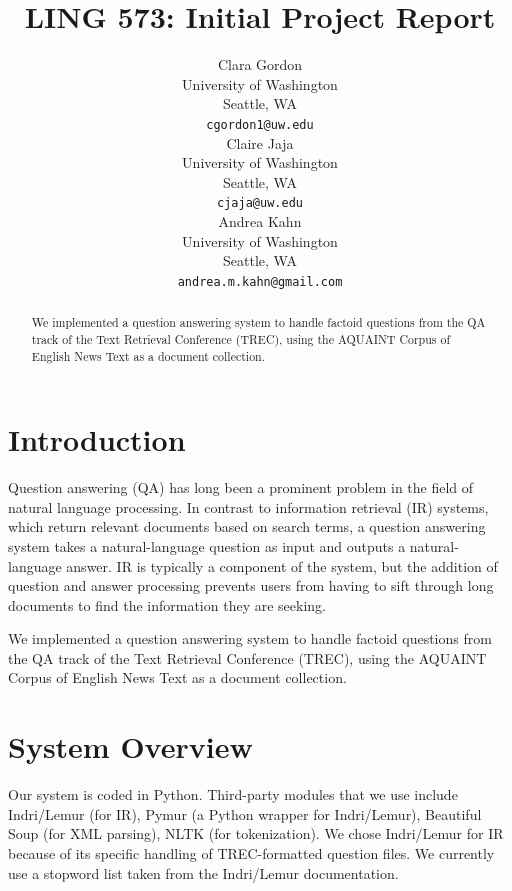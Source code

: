 \documentclass[11pt]{article}
\title{LING 573: Initial Project Report}
\author{Clara Gordon \\
  University of Washington \\
  Seattle, WA \\
  {\tt cgordon1@uw.edu} \\\And
  Claire Jaja \\
  University of Washington \\
  Seattle, WA \\
  {\tt cjaja@uw.edu} \\\And
  Andrea Kahn \\
  University of Washington \\
  Seattle, WA \\
  {\tt andrea.m.kahn@gmail.com} \\}
\date{}
\begin{document}
\maketitle
\begin{abstract}

We implemented a question answering system to handle factoid questions from the QA track of the Text Retrieval Conference (TREC), using the AQUAINT Corpus of English News Text as a document collection.

\end{abstract}

\section{Introduction}

Question answering (QA) has long been a prominent problem in the field of natural language processing. In contrast to information retrieval (IR) systems, which return relevant documents based on search terms, a question answering system takes a natural-language question as input and outputs a natural-language answer. IR is typically a component of the system, but the addition of question and answer processing prevents users from having to sift through long documents to find the information they are seeking.

We implemented a question answering system to handle factoid questions from the QA track of the Text Retrieval Conference (TREC), using the AQUAINT Corpus of English News Text as a document collection.

\section{System Overview}

Our system is coded in Python. Third-party modules that we use include Indri/Lemur (for IR), Pymur (a Python wrapper for Indri/Lemur), Beautiful Soup (for XML parsing), NLTK (for tokenization). We chose Indri/Lemur for IR because of its specific handling of TREC-formatted question files. We currently use a stopword list taken from the Indri/Lemur documentation.
\end{document}
